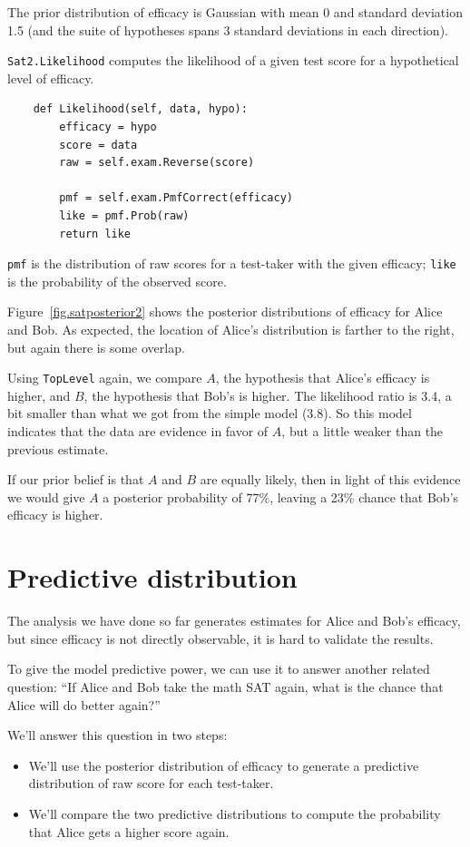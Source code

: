 \documentclass[12pt]{book}
\begin{document}
The prior distribution of efficacy is
Gaussian with mean 0 and standard deviation 1.5 (and the suite of
hypotheses spans 3 standard deviations in each direction).

\verb"Sat2.Likelihood" computes the likelihood of a given test score
for a hypothetical level of efficacy.

\begin{verbatim}
    def Likelihood(self, data, hypo):
        efficacy = hypo
        score = data
        raw = self.exam.Reverse(score)

        pmf = self.exam.PmfCorrect(efficacy)
        like = pmf.Prob(raw)
        return like
\end{verbatim}

{\tt pmf} is the distribution of raw scores for a test-taker
with the given efficacy; {\tt like} is the probability of
the observed score.

Figure~\ref{fig.satposterior2} shows the posterior distributions
of efficacy for Alice and Bob.  As expected, the location
of Alice's distribution is farther to the right, but again there
is some overlap.

Using {\tt TopLevel} again, we compare $A$, the
hypothesis that Alice's efficacy is higher, and $B$, the
hypothesis that Bob's is higher.  The likelihood ratio is
3.4, a bit smaller than what we got from the simple model (3.8).
So this model indicates that the data are evidence in favor
of $A$, but a little weaker than the previous estimate.

If our prior belief is that $A$ and $B$ are equally likely,
then in light of this evidence we would give $A$ a posterior
probability of 77\%, leaving a 23\% chance that Bob's efficacy
is higher.


\section{Predictive distribution}

The analysis we have done so far generates estimates for
Alice and Bob's efficacy, but since efficacy is not directly
observable, it is hard to validate the results.

To give the model predictive power, we can use it to answer
another related question: ``If Alice and Bob take the math SAT
again, what is the chance that Alice will do better again?''

We'll answer this question in two steps:

\begin{itemize}

\item We'll use the posterior distribution of efficacy to
generate a predictive distribution of raw score for each test-taker.

\item We'll compare the two predictive distributions to compute
the probability that Alice gets a higher score again.

\end{itemize}
\end{document}
